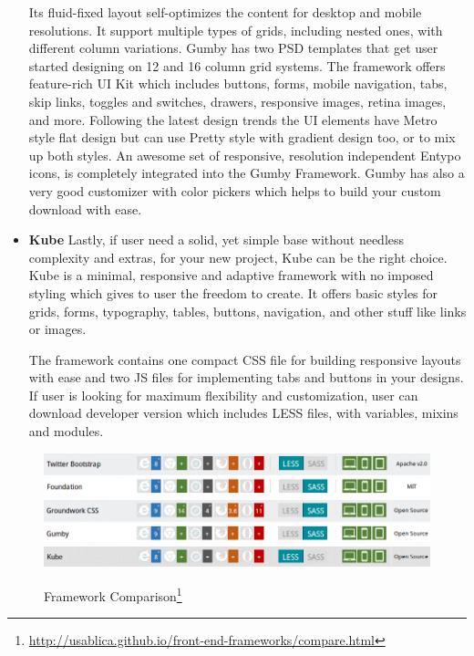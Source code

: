 \begin{itemize}
	Its fluid-fixed layout self-optimizes the content for desktop and mobile resolutions. It support multiple types of grids, including nested ones, with different column variations. Gumby has two PSD templates that get user started designing on 12 and 16 column grid systems.
	The framework offers feature-rich UI Kit which includes buttons, forms, mobile navigation, tabs, skip links, toggles and switches, drawers, responsive images, retina images, and more. Following the latest design trends the UI elements have Metro style flat design but can use Pretty style with gradient design too, or to mix up both styles. An awesome set of responsive, resolution independent Entypo icons, is completely integrated into the Gumby Framework. Gumby has also a very good customizer with color pickers which helps to build your custom download with ease.
	\item \textbf{Kube}
	\newline
	Lastly, if user need a solid, yet simple base without needless complexity and extras, for your new project, Kube can be the right choice. Kube is a minimal, responsive and adaptive framework with no imposed styling which gives to user the freedom to create. It offers basic styles for grids, forms, typography, tables, buttons, navigation, and other stuff like links or images.

	The framework contains one compact CSS file for building responsive layouts with ease and two JS files for implementing tabs and buttons in your designs. If user is looking for maximum flexibility and customization, user can download developer version which includes LESS files, with variables, mixins and modules.
	\end{itemize}

\begin{figure}[!ht]
\centering
\includegraphics[scale=0.7]{images/Bootstrap&Foundation.png}
\includegraphics[scale=0.7]{images/Groundwork&Gumby.png} 
\includegraphics[scale=0.7]{images/Kube.png}  
\caption[Framework Comparison]{Framework Comparison\footnote{\url{http://usablica.github.io/front-end-frameworks/compare.html}}}
\label{img:Bootstrap&Foundation.png}
\label{img:Groundwork&Gumby.png}   
\label{img:Kube.png}                          
\end{figure}

